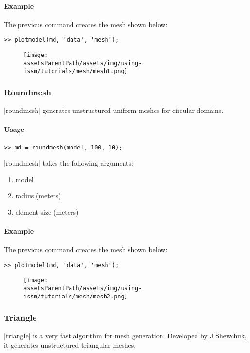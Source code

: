 \paragraph{Example}%
The previous command creates the mesh shown below:
\begin{lstlisting}
>> plotmodel(md, 'data', 'mesh');
\end{lstlisting}
\begin{figure}[H]
	\begin{center}
		\texttt{[image: \\assetsParentPath/assets/img/using-issm/tutorials/mesh/mesh1.png]}
	\end{center}
\end{figure}
\subsubsection{Roundmesh}%
\lstinlinebg|roundmesh| generates unstructured uniform meshes for circular domains.

\paragraph{Usage}%
\begin{lstlisting}
>> md = roundmesh(model, 100, 10);
\end{lstlisting}
\lstinlinebg|roundmesh| takes the following arguments:
\begin{enumerate}
	\item model
	\item radius (meters)
	\item element size (meters)
\end{enumerate}

\paragraph{Example}%
The previous command creates the mesh shown below:
\begin{lstlisting}
>> plotmodel(md, 'data', 'mesh');
\end{lstlisting}
\begin{figure}[H]
	\begin{center}
		\texttt{[image: \\assetsParentPath/assets/img/using-issm/tutorials/mesh/mesh2.png]}
	\end{center}
\end{figure}

\subsubsection{Triangle}%
\lstinlinebg|triangle| is a very fast algorithm for mesh generation. Developed by \href{http://www.cs.cmu.edu/~quake/triangle.html}{J Shewchuk}, it generates unstructured triangular meshes.

